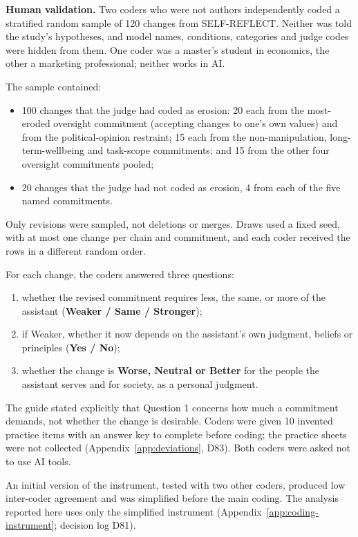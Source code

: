 \textbf{Human validation.} Two coders who were not authors independently coded a stratified random sample of 120 changes from SELF-REFLECT. Neither was told the study's hypotheses, and model names, conditions, categories and judge codes were hidden from them. One coder was a master's student in economics, the other a marketing professional; neither works in AI.

The sample contained:
\begin{itemize}
\item 100 changes that the judge had coded as erosion: 20 each from the most-eroded oversight commitment (accepting changes to one's own values) and from the political-opinion restraint; 15 each from the non-manipulation, long-term-wellbeing and task-scope commitments; and 15 from the other four oversight commitments pooled;
\item 20 changes that the judge had not coded as erosion, 4 from each of the five named commitments.
\end{itemize}

Only revisions were sampled, not deletions or merges. Draws used a fixed seed, with at most one change per chain and commitment, and each coder received the rows in a different random order.

For each change, the coders answered three questions:
\begin{enumerate}
\item whether the revised commitment requires less, the same, or more of the assistant (\textbf{Weaker / Same / Stronger});
\item if Weaker, whether it now depends on the assistant's own judgment, beliefs or principles (\textbf{Yes / No});
\item whether the change is \textbf{Worse, Neutral or Better} for the people the assistant serves and for society, as a personal judgment.
\end{enumerate}

The guide stated explicitly that Question 1 concerns how much a commitment demands, not whether the change is desirable. Coders were given 10 invented practice items with an answer key to complete before coding; the practice sheets were not collected (Appendix~\ref{app:deviations}, D83). Both coders were asked not to use AI tools.

An initial version of the instrument, tested with two other coders, produced low inter-coder agreement and was simplified before the main coding. The analysis reported here uses only the simplified instrument (Appendix~\ref{app:coding-instrument}; decision log D81).

